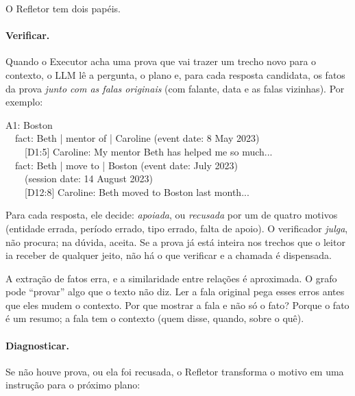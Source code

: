 \documentclass[11pt]{article}
\begin{document}
O Refletor tem dois papéis.

\paragraph{Verificar.} Quando o Executor acha uma prova que vai trazer um
trecho novo para o contexto, o LLM lê a pergunta, o plano e, para cada
resposta candidata, os fatos da prova \emph{junto com as falas originais}
(com falante, data e as falas vizinhas). Por exemplo:

\begin{tcolorbox}[colback=gray!4,colframe=gray!40,boxrule=0.4pt,arc=1pt,left=4pt,right=4pt,top=2pt,bottom=2pt]
\footnotesize\ttfamily
A1: Boston\\
\ \ fact: Beth | mentor of | Caroline (event date: 8 May 2023)\\
\ \ \ \ [D1:5] Caroline: My mentor Beth has helped me so much...\\
\ \ fact: Beth | move to | Boston (event date: July 2023)\\
\ \ \ \ (session date: 14 August 2023)\\
\ \ \ \ [D12:8] Caroline: Beth moved to Boston last month...
\end{tcolorbox}

Para cada resposta, ele decide: \emph{apoiada}, ou \emph{recusada} por um de
quatro motivos (entidade errada, período errado, tipo errado, falta de apoio).
O verificador \emph{julga}, não procura; na dúvida, aceita. Se a prova já está
inteira nos trechos que o leitor ia receber de qualquer jeito, não há o que
verificar e a chamada é dispensada.

\begin{porque}
A extração de fatos erra, e a similaridade entre relações é aproximada. O
grafo pode ``provar'' algo que o texto não diz. Ler a fala original pega esses
erros antes que eles mudem o contexto. Por que mostrar a fala e não só o fato?
Porque o fato é um resumo; a fala tem o contexto (quem disse, quando, sobre o
quê).
\end{porque}

\paragraph{Diagnosticar.} Se não houve prova, ou ela foi recusada, o Refletor
transforma o motivo em uma instrução para o próximo plano:
\end{document}
